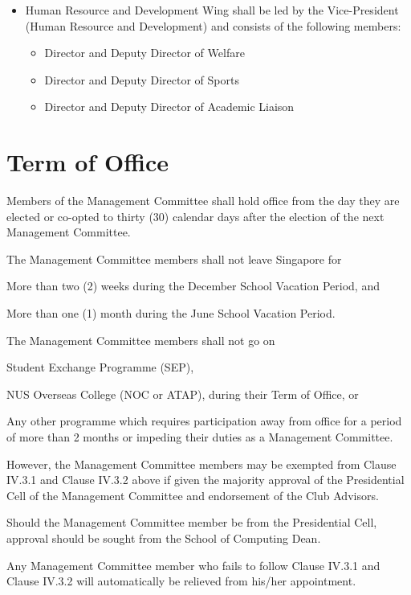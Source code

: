 \begin{itemize}
	\item Human Resource and Development Wing shall be led by the Vice-President (Human Resource and Development) and consists of the following members:
		\begin{itemize}
		\item Director and Deputy Director of Welfare
		\item Director and Deputy Director of Sports
		\item Director and Deputy Director of Academic Liaison
		\end{itemize}
	\end{itemize}

\section{Term of Office}
Members of the Management Committee shall hold office from the day they are elected or co-opted to thirty (30) calendar days after the election of the next Management Committee.
	\begin{legal}
	\item The Management Committee members shall not leave Singapore for
		\begin{legal}
		\item More than two (2) weeks during the December School Vacation Period, and
		\item More than one (1) month during the June School Vacation Period.
		\end{legal}
	
	\item The Management Committee members shall not go on
		\begin{legal}
		\item Student Exchange Programme (SEP),
		\item NUS Overseas College (NOC or ATAP), during their Term of Office, or
		\item Any other programme which requires participation away from office for a period of more than 2 months or impeding their duties as a Management Committee.
		\end{legal}
	
	\item However, the Management Committee members may be exempted from Clause IV.3.1 and Clause IV.3.2 above if given the majority approval of the Presidential Cell of the Management Committee and endorsement of the Club Advisors.
		\begin{legal}
		\item Should the Management Committee member be from the Presidential Cell, approval should be sought from the School of Computing Dean.
		\item Any Management Committee member who fails to follow Clause IV.3.1 and Clause IV.3.2 will automatically be relieved from his/her appointment.
		\end{legal}
	\end{legal}

